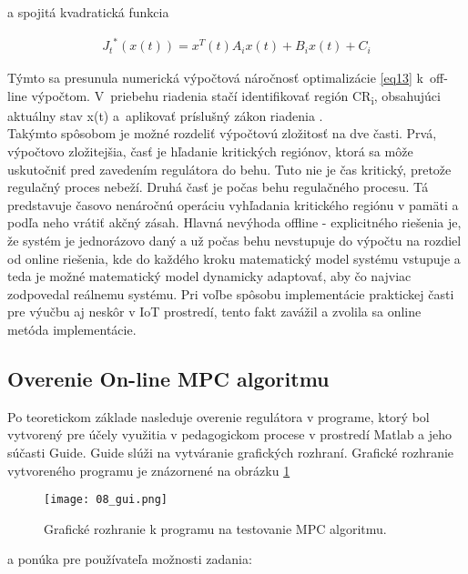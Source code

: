 a spojitá kvadratická funkcia

\begin{equation} \label{eq37}
\begin{split}
{J_{t}}^{*}\left( x\left( t \right) \right) = x^{T}\left( t \right)A_{i}x\left( t \right) + B_{i}x\left( t \right) + C_{i}
\end{split}
\end{equation}

Týmto sa presunula numerická výpočtová náročnosť optimalizácie \ref{eq13} k~off-line výpočtom. V~priebehu riadenia stačí identifikovať región CR\textsubscript{i}, obsahujúci aktuálny stav x(t) a~aplikovať príslušný
zákon riadenia \label{eq36}. \cite{MPC05} \\
Takýmto spôsobom je možné rozdeliť výpočtovú zložitosť na dve časti. Prvá, výpočtovo zložitejšia, časť je hľadanie kritických regiónov, ktorá sa môže uskutočniť pred zavedením regulátora do behu. Tuto nie je čas kritický, pretože regulačný proces nebeží. Druhá časť je počas behu regulačného procesu. Tá predstavuje časovo nenáročnú operáciu vyhľadania kritického regiónu v pamäti a podľa neho vrátiť akčný zásah. Hlavná nevýhoda offline - explicitného riešenia je, že systém je jednorázovo daný a už počas behu nevstupuje do výpočtu na rozdiel od online riešenia, kde do každého kroku matematický model systému vstupuje a teda je možné  matematický model dynamicky adaptovať, aby čo najviac zodpovedal reálnemu systému. Pri voľbe spôsobu implementácie praktickej časti pre výučbu aj neskôr v IoT prostredí, tento fakt zavážil a zvolila sa online metóda implementácie.

\subsection{Overenie On-line MPC algoritmu}
Po teoretickom základe nasleduje overenie regulátora v programe, ktorý bol vytvorený pre účely využitia v pedagogickom procese v prostredí Matlab a jeho súčasti Guide. Guide slúži na vytváranie grafických rozhraní. Grafické rozhranie vytvoreného programu je znázornené na obrázku \ref{08_gui} 

\begin{figure}[h]
\centering
\texttt{[image: 08\_gui.png]}
\caption{Grafické rozhranie k programu na testovanie MPC algoritmu.}
\label{08_gui}
\end{figure}

a ponúka pre používateľa možnosti zadania:


